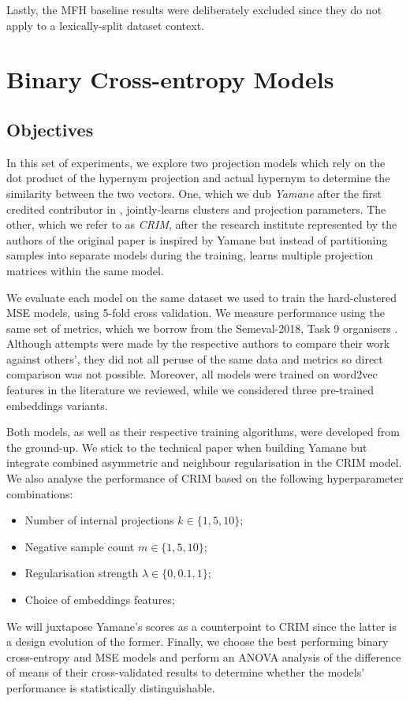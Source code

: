 Lastly, the \ac{MFH} baseline results were deliberately excluded since they do not apply to a lexically-split dataset context.

\section{Binary Cross-entropy Models}
\subsection{Objectives}
In this set of experiments, we explore two projection models which rely on the dot product of the hypernym projection and actual hypernym to determine the similarity between the two vectors.  One, which we dub \textit{Yamane} after the first credited contributor in \citep{yamane2016distributional}, jointly-learns clusters and projection parameters.  The other, which we refer to as \textit{CRIM}, after the research institute represented by the authors of the original paper \citep{bernier2018crim} is inspired by Yamane but instead of partitioning samples into separate models during the training, learns multiple projection matrices within the same model.

We evaluate each model on the same dataset we used to train the hard-clustered MSE  models, using 5-fold cross validation.  We measure performance using the same set of metrics, which we borrow from the Semeval-2018, Task 9 organisers \citep{camacho2018semeval}.  Although attempts were made by the respective authors to compare their work against others', they did not all peruse of the same data and metrics so direct comparison was not possible.  Moreover, all models were trained on word2vec features in the literature we reviewed, while we considered three pre-trained embeddings variants.  

Both models, as well as their respective training algorithms, were developed from the ground-up.  We stick to the technical paper when building Yamane but integrate combined asymmetric and neighbour regularisation in the CRIM model.  We also analyse the performance of CRIM based on the following hyperparameter combinations:
\begin{itemize}
    \item Number of internal projections $k \in \{1, 5, 10\}$;
    \item Negative sample count $m \in \{1, 5, 10\}$;
    \item Regularisation strength $\lambda \in \{0, 0.1, 1\}$;
    \item Choice of embeddings features;
\end{itemize}
We will juxtapose Yamane's scores as a counterpoint to CRIM since the latter is a design evolution of the former.  Finally, we choose the best performing binary cross-entropy and \ac{MSE} models and perform an \ac{ANOVA} analysis of the difference of means of their cross-validated results to determine whether the models' performance is statistically distinguishable.

